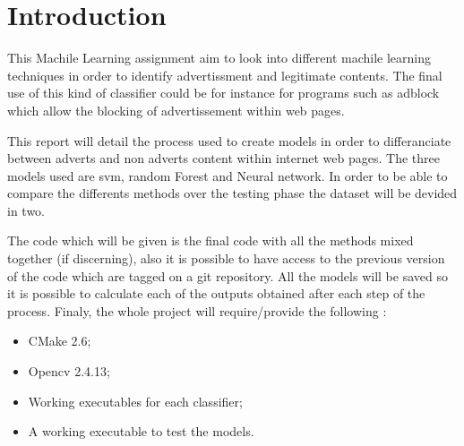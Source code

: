 \section{Introduction}

This Machile Learning assignment aim to look into different machile learning techniques in order to identify advertissment and legitimate contents. The final use of this kind of classifier could be for instance for programs such as adblock which allow the blocking of advertissement within web pages.

This report will detail the process used to create models in order to differanciate between adverts and non adverts content within internet web pages. The three models used are svm, random Forest and Neural network.
In order to be able to compare the differents methods over the testing phase the dataset will be devided in two.

The code which will be given is the final code with all the methods mixed together (if discerning), also it is possible to have access to the previous version of the code which are tagged on a git repository. All the models will be saved so it is possible to calculate each of the outputs obtained after each step of the process. Finaly, the whole project will require/provide the following :
\begin{itemize}
  \item CMake 2.6;
  \item Opencv 2.4.13;
  \item Working executables for each classifier;
  \item A working executable to test the models.
\end{itemize}
